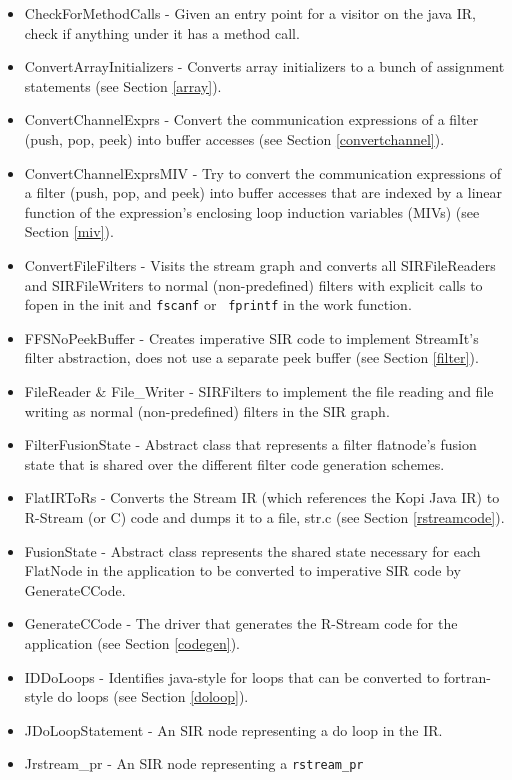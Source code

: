 \documentclass[10pt, letterpaper, onecolumn]{article}
\begin{document}
\begin{itemize}
\item CheckForMethodCalls -  Given an entry point for a visitor on the java
IR, check if anything under it has a method call.
\item ConvertArrayInitializers - Converts array initializers to a bunch of
assignment statements (see Section \ref{array}). 
\item ConvertChannelExprs - Convert the communication expressions of a
filter (push, pop, peek) into buffer accesses (see Section \ref{convertchannel}). 
\item ConvertChannelExprsMIV  - Try to convert the communication expressions
of a filter (push, pop, and peek) into buffer accesses that are
indexed by a linear function of the expression's enclosing loop
induction variables (MIVs) (see Section \ref{miv}). 
\item ConvertFileFilters - Visits the stream graph and converts all
SIRFileReaders and SIRFileWriters to normal (non-predefined) filters
with explicit calls to fopen in the init and {\tt fscanf} or {\tt
fprintf} in the work function.
\item FFSNoPeekBuffer -  Creates imperative SIR code to implement
  StreamIt's filter abstraction, does not use a separate peek buffer
  (see Section \ref{filter}).
\item FileReader \& File\_Writer  - SIRFilters to implement the file
  reading and file writing as normal (non-predefined) filters in the
  SIR graph.
\item FilterFusionState - Abstract class that represents a filter
flatnode's fusion state that is shared over the different filter code
generation schemes.
\item FlatIRToRs - Converts the Stream IR (which references the Kopi
Java IR) to R-Stream (or C) code and dumps it to a file, str.c (see
Section \ref{rstreamcode}).
\item FusionState - Abstract class represents the shared state
necessary for each FlatNode in the application to be converted to
imperative SIR code by GenerateCCode.
\item GenerateCCode - The driver that generates the R-Stream code for the
  application (see Section \ref{codegen}).
\item IDDoLoops - Identifies java-style for loops that can be
converted to fortran-style do loops (see Section \ref{doloop}).
\item JDoLoopStatement - An SIR node representing a do loop in the IR.
\item Jrstream\_pr - An SIR node representing a {\tt rstream\_pr}

\end{itemize}
\end{document}
